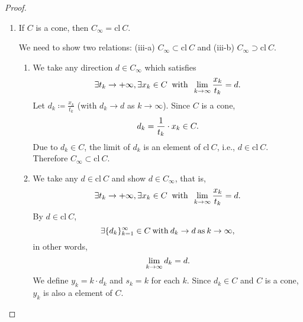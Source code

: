 \documentclass[a4paper,11pt, oneside]{book}
\theoremstyle{definition}
\begin{document}
\begin{proof}
\begin{enumerate}[label=\roman*,align=CenterWithParen]
    We need to show two relations: (ii-a) $(\text{cl}\:C)_{\infty} \supset C_{\infty}$ (ii-b) $(\text{cl}\:C)_{\infty} \subset C_{\infty}$.

      \begin{enumerate}[label=ii-\alph*,align=CenterWithParen2]
        \item We show that $C_{\infty}$ is included in $(\text{cl}\:C)_{\infty}$. However it is clear from the definition of asymptotic cones.

        \item We show that $(\text{cl}\:C)_{\infty} \subset C_{\infty}$. Like (i-b), we will show that.

      \end{enumerate}
      Then the proof of (ii) is also completed.
    \item If $C$ is a cone, then $C_{\infty} = \text{cl}\:C$.

    We need to show two relations: (iii-a) $C_{\infty} \subset \text{cl}\:C$ and (iii-b) $C_{\infty} \supset  \text{cl}\:C$.

    \begin{enumerate}[label=iii-\alph*,align=CenterWithParen2]
      \item We take any direction $d \in C_{\infty}$ which satisfies
      \begin{equation}
        \exists t_k \rightarrow + \infty , \exists x_k \in C \:\text{ with }\: \lim_{k \to \infty} \frac{x_k}{t_k} = d. \notag
      \end{equation}
      Let $d_k \coloneqq \frac{x_k}{t_k}$ (with $d_k \rightarrow d$ as $k \rightarrow \infty$). Since $C$ is a cone,
      \begin{equation}
        d_k = \frac{1}{t_k} \cdot x_k \in C. \notag
      \end{equation}
      Due to $d_k \in C$, the limit of $d_k$ is an element of $\text{cl}\:C$, i.e., $d \in \text{cl}\:C$.
      Therefore $C_{\infty} \subset \text{cl}\:C$.

      \item We take any $d \in \text{cl}\:C$ and show $d \in C_{\infty}$, that is,
      \begin{equation}
        \exists t_k \rightarrow + \infty , \exists x_k \in C \:\text{ with }\: \lim_{k \to \infty} \frac{x_k}{t_k} = d. \notag
      \end{equation}
      By $d \in \text{cl}\:C$,
      \begin{equation}
        \exists \{d_k\}_{k=1}^{\infty} \in C \:\text{with}\: d_k \rightarrow d \:\text{as}\: k \rightarrow \infty, \notag
      \end{equation}
      in other words,
      \begin{equation}
        \lim_{k \to \infty} d_k = d. \notag
      \end{equation}
      We define $y_k = k \cdot d_k$ and $s_k = k$ for each $k$. Since $d_k \in C$ and $C$ is a cone, $y_k$ is also a element of $C$.


\end{enumerate}
\end{enumerate}
\end{proof}
\end{document}
